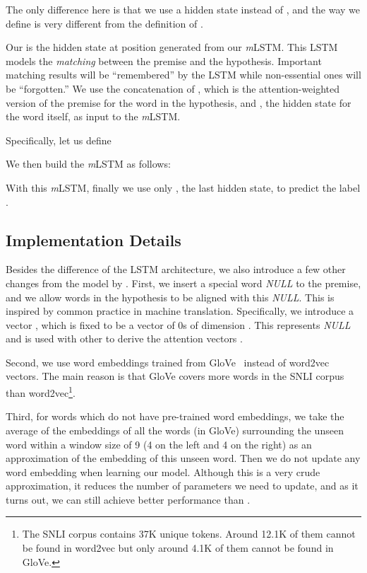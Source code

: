 \documentclass[11pt,letterpaper]{article}
\begin{document}
\small

\normalsize
The only difference here is that we use a hidden state  instead of , and the way we define  is very different from the definition of .

Our  is the hidden state at position  generated from our \emph{m}LSTM.
This LSTM models the \emph{matching} between the premise and the hypothesis.
Important matching results will be ``remembered'' by the LSTM while non-essential ones will be ``forgotten.''
We use the concatenation of , which is the attention-weighted version of the premise for the  word in the hypothesis, and , the hidden state for the  word itself, as input to the \emph{m}LSTM.

Specifically, let us define

\small

\normalsize
We then build the \emph{m}LSTM as follows:

\small

\normalsize
With this \emph{m}LSTM, finally we use only , the last hidden state, to predict the label .


\subsection{Implementation Details}
\label{subsec:details}

Besides the difference of the LSTM architecture, we also introduce a few other changes from the model by .
First, we insert a special word \emph{NULL} to the premise, and we allow words in the hypothesis to be aligned with this \emph{NULL}.
This is inspired by common practice in machine translation.
Specifically, we introduce a vector , which is fixed to be a vector of 0s of dimension .
This  represents \emph{NULL} and is used with other  to derive the attention vectors .

Second, we use word embeddings trained from GloVe~\cite{pennington:emnlp14} instead of word2vec vectors.
The main reason is that GloVe covers more words in the SNLI corpus than word2vec\footnote{The SNLI corpus contains 37K unique tokens. Around 12.1K of them cannot be found in word2vec but only around 4.1K of them cannot be found in GloVe.}.

Third, for words which do not have pre-trained word embeddings, we take the average of the embeddings of all the words (in GloVe) surrounding the unseen word within a window size of 9 (4 on the left and 4 on the right) as an approximation of the embedding of this unseen word.
Then we do not update any word embedding when learning our model.
Although this is a very crude approximation, it reduces the number of parameters we need to update, and as it turns out, we can still achieve better performance than .
\end{document}
